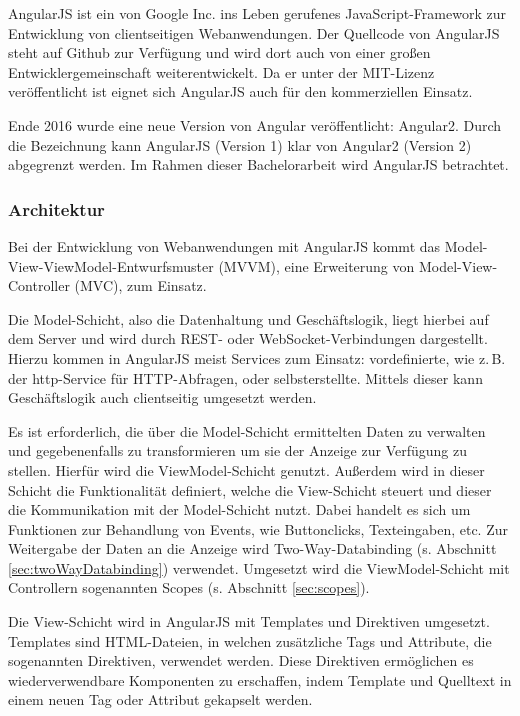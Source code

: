 AngularJS ist ein von Google Inc. ins Leben gerufenes JavaScript-Framework zur Entwicklung von clientseitigen Webanwendungen\cite{angular-faq}. Der Quellcode von AngularJS steht auf Github zur Verfügung und wird dort auch von einer großen Entwicklergemeinschaft weiterentwickelt\cite[][9]{ng-book}. Da er unter der MIT-Lizenz veröffentlicht ist eignet sich AngularJS auch für den kommerziellen Einsatz\cites[9]{ng-book}[]{mit-license}.

Ende 2016 wurde eine neue Version von Angular veröffentlicht: Angular2\cite{ng2-out}. Durch die Bezeichnung kann AngularJS (Version 1) klar von Angular2 (Version 2) abgegrenzt werden. Im Rahmen dieser Bachelorarbeit wird AngularJS betrachtet.

\subsubsection{Architektur}
Bei der Entwicklung von Webanwendungen mit AngularJS kommt das Model-View-ViewModel-Entwurfsmuster (MVVM), eine Erweiterung von Model-View-Controller (MVC), zum Einsatz\cite[][21]{angular-boehm}. 

Die Model-Schicht, also die Datenhaltung und Geschäftslogik, liegt hierbei auf dem Server und wird durch REST- oder WebSocket-Verbindungen dargestellt. Hierzu kommen in AngularJS meist Services zum Einsatz: vordefinierte, wie z.\,B. der http-Service für HTTP-Abfragen, oder selbsterstellte\cite{angular-services}. Mittels dieser kann Geschäftslogik auch clientseitig umgesetzt werden.\cite[][21]{angular-boehm}

Es ist erforderlich, die über die Model-Schicht ermittelten Daten zu verwalten und gegebenenfalls zu transformieren um sie der Anzeige zur Verfügung zu stellen. Hierfür wird die ViewModel-Schicht genutzt. Außerdem wird in dieser Schicht die Funktionalität definiert, welche die View-Schicht steuert und dieser die Kommunikation mit der Model-Schicht nutzt. Dabei handelt es sich um Funktionen zur Behandlung von Events, wie Buttonclicks, Texteingaben, etc. Zur Weitergabe der Daten an die Anzeige wird Two-Way-Databinding (s. Abschnitt \ref{sec:twoWayDatabinding}) verwendet. Umgesetzt wird die ViewModel-Schicht mit Controllern sogenannten Scopes (s. Abschnitt \ref{sec:scopes}). \cite[][21\psq]{angular-boehm}

Die View-Schicht wird in AngularJS mit Templates und Direktiven umgesetzt. Templates sind HTML-Dateien, in welchen zusätzliche Tags und Attribute, die sogenannten Direktiven, verwendet werden. \cite[][1\psqq]{angular-boehm}Diese Direktiven ermöglichen es wiederverwendbare Komponenten zu erschaffen, indem Template und Quelltext in einem neuen Tag oder Attribut gekapselt werden\cite[][49\psq]{angular-boehm}.

